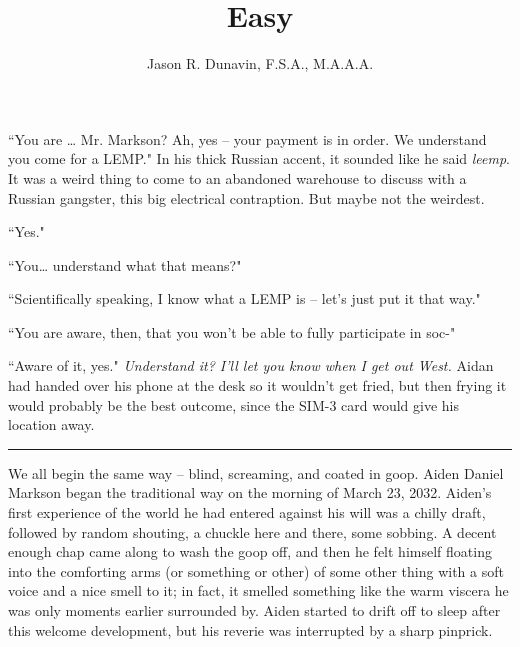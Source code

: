 \documentclass[11pt]{book}
\title{Easy}
\author{Jason R. Dunavin, F.S.A., M.A.A.A.}
\begin{document}
	\maketitle
	
	``You are … Mr. Markson? Ah, yes – your payment is in order. We understand you come for a LEMP." In his thick Russian accent, it sounded like he said \textit{leemp}. It was a weird thing to come to an abandoned warehouse to discuss with a Russian gangster, this big electrical contraption. But maybe not the weirdest.
	
	``Yes."
	
	``You… understand what that means?"
	
	``Scientifically speaking, I know what a LEMP is – let’s just put it that way."
	
	``You are aware, then, that you won’t be able to fully participate in soc-"
	
	``Aware of it, yes." \textit{Understand it? I'll let you know when I get out West.} Aidan had handed over his phone at the desk so it wouldn't get fried, but then frying it would probably be the best outcome, since the SIM-3 card would give his location away.
	
	\vspace{0.5cm}
	\hrule
	\vspace{0.5cm}
	
	We all begin the same way – blind, screaming, and coated in goop. Aiden Daniel Markson began the traditional way on the morning of March 23, 2032. Aiden's first experience of the world he had entered against his will was a chilly draft, followed by random shouting, a chuckle here and there, some sobbing. A decent enough chap came along to wash the goop off, and then he felt himself floating into the comforting arms (or something or other) of some other thing with a  soft voice and a nice smell to it; in fact, it smelled something like the warm viscera he was only moments earlier surrounded by. Aiden started to drift off to sleep after this welcome development, but his reverie was interrupted by a sharp pinprick.
	
\end{document}
